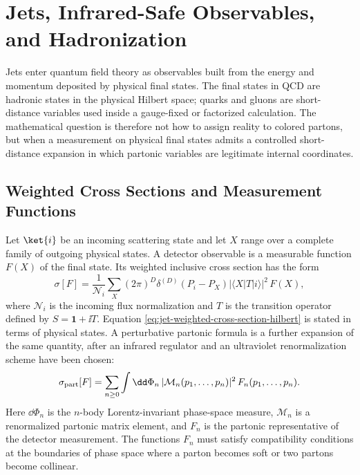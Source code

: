 \chapter{Jets, Infrared-Safe Observables, and Hadronization}
\label{ch:jets-ir-safe-observables-hadronization}
\ConventionsMixed

Jets enter quantum field theory as observables built from the energy and
momentum deposited by physical final states.  The final states in QCD are
hadronic states in the physical Hilbert space; quarks and gluons are
short-distance variables used inside a gauge-fixed or factorized calculation.
The mathematical question is therefore not how to assign reality to colored
partons, but when a measurement on physical final states admits a controlled
short-distance expansion in which partonic variables are legitimate internal
coordinates.

\section{Weighted Cross Sections and Measurement Functions}

Let \(\ket{i}\) be an incoming scattering state and let \(X\) range over a
complete family of outgoing physical states.  A detector observable is a
measurable function \(F(X)\) of the final state.  Its weighted inclusive cross
section has the form
\begin{equation}
  \sigma[F]
  =
  \frac{1}{\mathcal N_i}
  \sum_X
  (2\pi)^D\delta^{(D)}(P_i-P_X)
  |\langle X|T|i\rangle|^2\,F(X),
  \label{eq:jet-weighted-cross-section-hilbert}
\end{equation}
where \(\mathcal N_i\) is the incoming flux normalization and \(T\) is the
transition operator defined by \(S=\mathbf 1+\ii T\).  Equation
\eqref{eq:jet-weighted-cross-section-hilbert} is stated in terms of physical
states.  A perturbative partonic formula is a further expansion of the same
quantity, after an infrared regulator and an ultraviolet renormalization
scheme have been chosen:
\begin{equation}
  \sigma_{\rm part}[F]
  =
  \sum_{n\geq0}
  \int \dd\Phi_n\,
  |\mathcal M_n(p_1,\ldots,p_n)|^2\,
  F_n(p_1,\ldots,p_n).
  \label{eq:jet-partonic-measurement-function}
\end{equation}
Here \(\dd\Phi_n\) is the \(n\)-body Lorentz-invariant phase-space measure,
\(\mathcal M_n\) is a renormalized partonic matrix element, and \(F_n\) is the
partonic representative of the detector measurement.  The functions \(F_n\)
must satisfy compatibility conditions at the boundaries of phase space where a
parton becomes soft or two partons become collinear.

